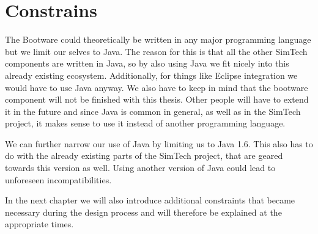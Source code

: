 \section{Constrains}

The Bootware could theoretically be written in any major programming language but we limit our selves to Java.
The reason for this is that all the other SimTech components are written in Java, so by also using Java we fit nicely into this already existing ecosystem.
Additionally, for things like Eclipse integration we would have to use Java anyway.
We also have to keep in mind that the bootware component will not be finished with this thesis.
Other people will have to extend it in the future and since Java is common in general, as well as in the SimTech project, it makes sense to use it instead of another programming language.

We can further narrow our use of Java by limiting us to Java 1.6.
This also has to do with the already existing parts of the SimTech project, that are geared towards this version as well.
Using another version of Java could lead to unforeseen incompatibilities.

In the next chapter we will also introduce additional constraints that became necessary during the design process and will therefore be explained at the appropriate times.
